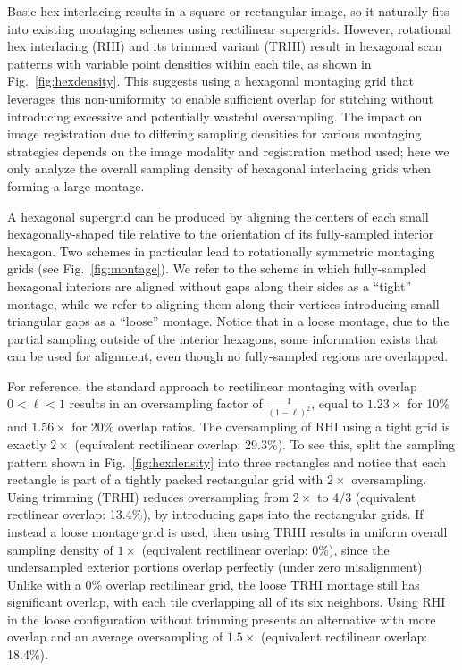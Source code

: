 \documentclass{article}
\newcommand{\reffig}[1]{Fig.~\ref{fig:#1}}
\begin{document}
Basic hex interlacing results in a square or rectangular image, so it naturally
fits into existing montaging schemes using rectilinear supergrids.
%
However, rotational hex interlacing (RHI) and its trimmed variant (TRHI) result in
hexagonal scan patterns with variable point densities within each tile, as shown
in \reffig{hexdensity}.
%
This suggests using a hexagonal montaging grid that leverages this
non-uniformity to enable sufficient overlap for stitching without introducing
excessive and potentially wasteful oversampling.
%
The impact on image registration due to differing sampling densities for various
montaging strategies depends on the image modality and registration method used;
here we only analyze the overall sampling density of hexagonal interlacing grids
when forming a large montage.


A hexagonal supergrid can be produced by aligning the centers of each small
hexagonally-shaped tile relative to the orientation of its fully-sampled
interior hexagon.
%
Two schemes in particular lead to rotationally symmetric montaging grids (see \reffig{montage}).
%
We refer to the scheme in which fully-sampled hexagonal interiors are aligned
without gaps along their sides as a ``tight'' montage, while we refer to
aligning them along their vertices introducing small triangular gaps as a
``loose'' montage.
%
Notice that in a loose montage, due to the partial sampling outside of the
interior hexagons, some information exists that can be used for alignment, even
though no fully-sampled regions are overlapped.



For reference, the standard approach to rectilinear montaging with overlap
$0<\ell<1$ results in an oversampling factor of $\frac{1}{(1-\ell)^2}$, equal to
$1.23\times$ for 10\% and $1.56\times$ for 20\% overlap ratios.
%
The oversampling of RHI using a tight grid is exactly $2\times$ (equivalent rectilinear
overlap: 29.3\%).
%
To see this, split the sampling pattern shown in \reffig{hexdensity} into three
rectangles and notice that each rectangle is part of a tightly packed
rectangular grid with $2\times$ oversampling.
%
Using trimming (TRHI) reduces oversampling from $2\times$ to 4/3 (equivalent rectlinear
overlap: 13.4\%), by introducing gaps into the rectangular grids.
%
If instead a loose montage grid is used, then using TRHI results in uniform
overall sampling density of $1\times$ (equivalent rectilinear overlap: 0\%), since the
undersampled exterior portions overlap perfectly (under zero misalignment).
%
Unlike with a 0\% overlap rectilinear grid, the loose TRHI montage still has
significant overlap, with each tile overlapping all of its six neighbors.
%
Using RHI in the loose configuration without trimming presents an alternative
with more overlap and an average oversampling of $1.5\times$ (equivalent rectilinear
overlap: 18.4\%).
\end{document}

